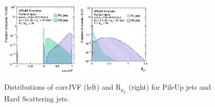 \begin{figure}[tbp]
    \begin{center}
    \includegraphics[width=0.34\textwidth,keepaspectratio]{figures/Reconstruction/corrJVF}
    \includegraphics[width=0.32\textwidth,keepaspectratio]{figures/Reconstruction/RPT}
    \caption{
    Distributions of corrJVF (left) and R$_{p_{T}}$ (right) for PileUp jets and Hard Scattering jets. \cite{PERF-2014-03}
    }
    \label{fig:JVT}
    \end{center}
\end{figure}
